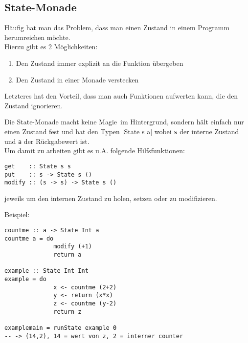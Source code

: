 \documentclass{beamer}
\begin{document}
\subsection{State-Monade}
\begin{frame}[fragile]
Häufig hat man das Problem, dass man einen Zustand in einem Programm herumreichen möchte.\\
\pause
Hierzu gibt es 2 Möglichkeiten:
\begin{enumerate}
 \item Den Zustand immer explizit an die Funktion übergeben
 \item Den Zustand in einer Monade verstecken
\end{enumerate}
\pause
Letzteres hat den Vorteil, dass man auch Funktionen aufwerten kann, die den Zustand ignorieren.
\end{frame}

\begin{frame}[fragile]
Die State-Monade macht keine \glqq Magie\grqq \ im Hintergrund, sondern hält einfach nur einen Zustand fest und hat den Typen
|State s a|
wobei \texttt{s} der interne Zustand und \texttt{a} der Rückgabewert ist.\\
\pause
Um damit zu arbeiten gibt es u.A. folgende Hilfsfunktionen:
\begin{verbatim}
get    :: State s s
put    :: s -> State s ()
modify :: (s -> s) -> State s ()
\end{verbatim}
jeweils um den internen Zustand zu holen, setzen oder zu modifizieren.
\end{frame}

\begin{frame}[fragile]
Beispiel:
\begin{verbatim}
countme :: a -> State Int a
countme a = do
              modify (+1)
              return a

example :: State Int Int
example = do
              x <- countme (2+2)
              y <- return (x*x)
              z <- countme (y-2)
              return z

examplemain = runState example 0
-- -> (14,2), 14 = wert von z, 2 = interner counter
\end{verbatim}
\end{frame}

\begin{comment}
\begin{frame}[fragile]
Beispiel 2:
\begin{verbatim}
data Spieler = X | O
data TicTacToeSpielfeld = Array (Int,Int) Spieler
data TicTacToe a = State TicTacToeSpielfeld a

macheSpielzug :: (Int, Int) -> Spieler -> TicTacToe ()
macheSpielzug pos s = modify ((flip (//)) [(pos,s)])

spielVorbei :: TicTacToe Bool
spielVorbei = do
                spielfeld <- get
                return (istVorbei spielfeld)
\end{verbatim}
\end{frame}
\end{comment}
\end{document}
